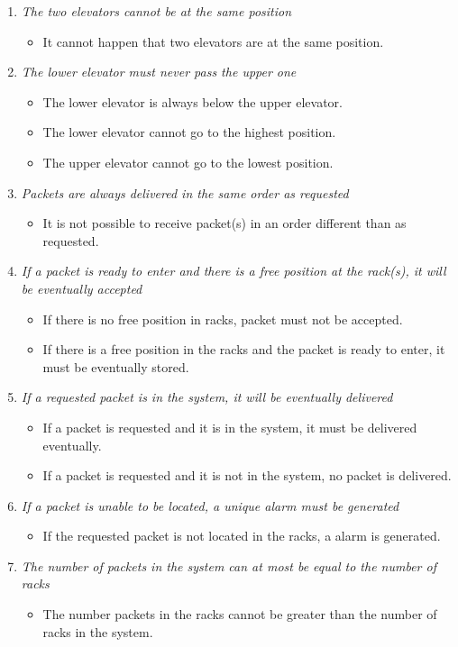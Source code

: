 \begin{enumerate}
\item \textit{The two elevators cannot be at the same position}
	\begin{itemize}
	\item  It cannot happen that two elevators are at the same 
	position.
	\end{itemize}	
	
\item \textit{The lower elevator must never pass the upper one}
	\begin{itemize}
	\item The lower elevator is always below the upper elevator.
	\item The lower elevator cannot go to the highest position.
	\item The upper elevator cannot go to the lowest position.
	\end{itemize}
	
\item \textit{Packets are always delivered in the same order as
	requested}	
	\begin{itemize}
	\item It is not possible to receive packet(s) in an order different
	than as requested.
	\end{itemize}
	
\item \textit{If a packet is ready to enter and there is a free
	position at the rack(s), it will be eventually accepted}
	\begin{itemize}
	\item If there is no free position in racks, packet must not be 
	accepted.
	\item If there is a free position in the racks and the packet is 
	ready to enter, it must be eventually stored.
	\end{itemize}
	
\item \textit{If a requested packet is in the system, it will be
	eventually delivered}
	\begin{itemize}
	\item If a packet is requested and it is in the system, it must be
	delivered eventually.
	\item If a packet is requested and it is not in the system, no 
	packet is delivered.
	\end{itemize}
	
\item \textit{If a packet is unable to be located, a unique alarm must 
	be generated}
	\begin{itemize}	
	\item If the requested packet is not located in the racks, a alarm
	is generated.
	\end{itemize}
		
\item \textit{The number of packets in the system can at most be equal to the number of racks}
	\begin{itemize}
	\item The number packets in the racks cannot be greater than the 
	number of racks in the system.
	\end{itemize}
\end{enumerate}
